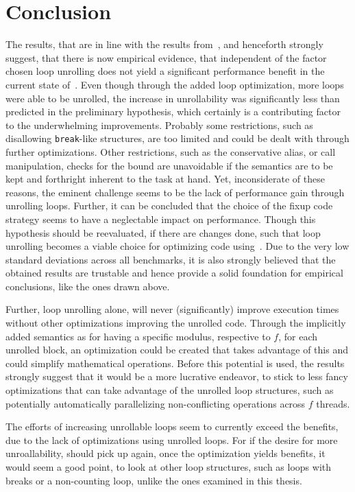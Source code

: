 \chapter{Conclusion}\label{sec:conclusion}

The results, that are in line with the results from~\cite{aebi18bachelorarbeit}, and henceforth strongly suggest, that there is now empirical evidence, that independent of the factor chosen loop unrolling does not yield a significant performance benefit in the current state of~\libFIRM.
Even though through the added loop optimization, more loops were able to be unrolled, the increase in unrollability was significantly less than predicted in the preliminary hypothesis, which certainly is a contributing factor to the underwhelming improvements.
Probably some restrictions, such as disallowing \texttt{break}-like structures, are too limited and could be dealt with through further optimizations.
Other restrictions, such as the conservative alias, or call manipulation, checks for the bound are unavoidable if the semantics are to be kept and forthright inherent to the task at hand.
Yet, inconsiderate of these reasons, the eminent challenge seems to be the lack of performance gain through unrolling loops.
Further, it can be concluded that the choice of the fixup code strategy seems to have a neglectable impact on performance.
Though this hypothesis should be reevaluated, if there are changes done, such that loop unrolling becomes a viable choice for optimizing code using~\libFIRM.
Due to the very low standard deviations across all benchmarks, it is also strongly believed that the obtained results are trustable and hence provide a solid foundation for empirical conclusions, like the ones drawn above.

Further, loop unrolling alone, will never (significantly) improve execution times without other optimizations improving the unrolled code.
Through the implicitly added semantics as for having a specific modulus, respective to $f$, for each unrolled block, an optimization could be created that takes advantage of this and could simplify mathematical operations.
Before this potential is used, the results strongly suggest that it would be a more lucrative endeavor, to stick to less fancy optimizations that can take advantage of the unrolled loop structures, such as potentially automatically parallelizing non-conflicting operations across $f$ threads. %

The efforts of increasing unrollable loops seem to currently exceed the benefits, due to the lack of optimizations using unrolled loops.
For if the desire for more unroallability, should pick up again, once the optimization yields benefits, it would seem a good point, to look at other loop structures, such as loops with breaks or a non-counting loop, unlike the ones examined in this thesis.
